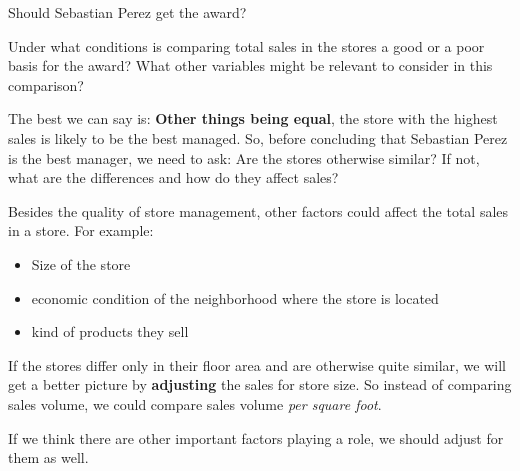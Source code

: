 \documentclass[
  12pt,
  letterpaper,
  DIV=11,
  numbers=noendperiod]{scrreprt}
\providecommand{\tightlist}{%
  \setlength{\itemsep}{0pt}\setlength{\parskip}{0pt}}
\begin{document}
Should Sebastian Perez get the award?

\begin{tcolorbox}[enhanced jigsaw, colback=white, leftrule=.75mm, toprule=.15mm, bottomtitle=1mm, breakable, coltitle=black, toptitle=1mm, title={Quick Check}, opacitybacktitle=0.6, colbacktitle=quarto-callout-note-color!10!white, arc=.35mm, left=2mm, colframe=quarto-callout-note-color-frame, titlerule=0mm, rightrule=.15mm, bottomrule=.15mm, opacityback=0]

Under what conditions is comparing total sales in the stores a good or a
poor basis for the award? What other variables might be relevant to
consider in this comparison?

\end{tcolorbox}

\begin{tcolorbox}[enhanced jigsaw, colback=white, leftrule=.75mm, toprule=.15mm, bottomtitle=1mm, breakable, coltitle=black, toptitle=1mm, title={Suggested answer}, opacitybacktitle=0.6, colbacktitle=quarto-callout-note-color!10!white, arc=.35mm, left=2mm, colframe=quarto-callout-note-color-frame, titlerule=0mm, rightrule=.15mm, bottomrule=.15mm, opacityback=0]

The best we can say is: \textbf{Other things being equal}, the store
with the highest sales is likely to be the best managed. So, before
concluding that Sebastian Perez is the best manager, we need to ask: Are
the stores otherwise similar? If not, what are the differences and how
do they affect sales?

Besides the quality of store management, other factors could affect the
total sales in a store. For example:

\begin{itemize}
\tightlist
\item
  Size of the store
\item
  economic condition of the neighborhood where the store is located
\item
  kind of products they sell
\end{itemize}

\end{tcolorbox}

\begin{tcolorbox}[enhanced jigsaw, colback=white, leftrule=.75mm, toprule=.15mm, bottomtitle=1mm, breakable, coltitle=black, toptitle=1mm, title=\textcolor{quarto-callout-important-color}{\faExclamation}\hspace{0.5em}{Important}, opacitybacktitle=0.6, colbacktitle=quarto-callout-important-color!10!white, arc=.35mm, left=2mm, colframe=quarto-callout-important-color-frame, titlerule=0mm, rightrule=.15mm, bottomrule=.15mm, opacityback=0]

If the stores differ only in their floor area and are otherwise quite
similar, we will get a better picture by \textbf{adjusting} the sales
for store size. So instead of comparing sales volume, we could compare
sales volume \emph{per square foot}.

If we think there are other important factors playing a role, we should
adjust for them as well.

\end{tcolorbox}
\end{document}
